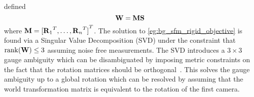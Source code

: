 defined
\begin{equation}\label{eg:bg_sfm_rigid_objective}
	\boldsymbol{\mathbf{W}} = \boldsymbol{\mathbf{M}} \boldsymbol{\mathbf{S}}
\end{equation}
where $\boldsymbol{\mathbf{M}} = {[{\boldsymbol{\mathbf{R}}_1}^T, \ldots, {\boldsymbol{\mathbf{R}}_n}^T]}^T$. The solution to
\cref{eg:bg_sfm_rigid_objective} is found via a 
Singular Value Decomposition (SVD) under the constraint that 
$\operatorname{rank}(\boldsymbol{\mathbf{W}}) \leq 3$ assuming noise free measurements. 
The SVD introduces a $3 \times 3$ gauge ambiguity which
can be disambiguated by imposing metric constraints on the fact that the
rotation matrices should be orthogonal~\cite{tomasi1992shape}. This solves the
gauge ambiguity up to a global rotation which can be resolved by assuming that
the world transformation matrix is equivalent to the rotation of the first
camera.

